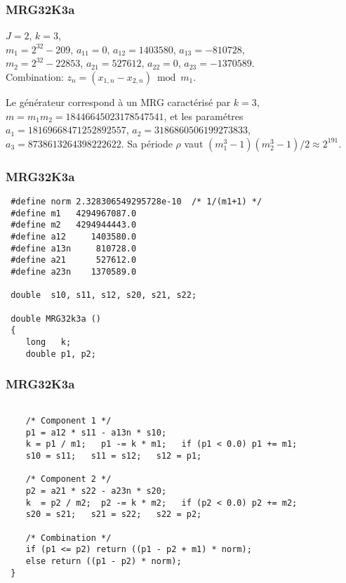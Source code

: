 \documentclass[t,usepdftitle=false]{beamer}
\begin{document}
\begin{frame}
\frametitle{MRG32K3a}

$J=2$, $k=3$, \\
$m_1 = 2^{32} -209$, $a_{11} = 0$, $a_{12} = 1403580$, $a_{13} = -810728$,\\
$m_2 = 2^{32}-22853$, $a_{21} = 527612$, $a_{22} = 0$, $a_{23} = -1370589$.\\
Combination: $z_n = (x_{1,n} - x_{2,n}) \bmod m_1$.

\mbox{}

Le générateur correspond à un MRG caractérisé par $k=3$, $m = m_1 m_2
= 18446645023178547541$, et les paramétres $a_{1} =
18169668471252892557$, $a_{2} = 3186860506199273833$, $a_{3} =
8738613264398222622$. Sa période $\rho$ vaut $(m_1^3-1)(m_2^3-1)/2
\approx 2^{191}$.

\end{frame}

\begin{frame}[fragile]
\frametitle{MRG32K3a}

\begin{footnotesize}
\begin{verbatim}
 #define norm 2.328306549295728e-10  /* 1/(m1+1) */
 #define m1   4294967087.0
 #define m2   4294944443.0
 #define a12     1403580.0
 #define a13n     810728.0
 #define a21      527612.0
 #define a23n    1370589.0

 double  s10, s11, s12, s20, s21, s22;

 double MRG32k3a ()
 {
    long   k;
    double p1, p2;
\end{verbatim}
\end{footnotesize}


\end{frame}

\begin{frame}[fragile]
\frametitle{MRG32K3a}

\begin{footnotesize}
\begin{verbatim}

    /* Component 1 */
    p1 = a12 * s11 - a13n * s10;
    k = p1 / m1;   p1 -= k * m1;   if (p1 < 0.0) p1 += m1;
    s10 = s11;   s11 = s12;   s12 = p1;

    /* Component 2 */
    p2 = a21 * s22 - a23n * s20;
    k  = p2 / m2;  p2 -= k * m2;   if (p2 < 0.0) p2 += m2;
    s20 = s21;   s21 = s22;   s22 = p2;

    /* Combination */
    if (p1 <= p2) return ((p1 - p2 + m1) * norm);
    else return ((p1 - p2) * norm);
 }
\end{verbatim}
\end{footnotesize}

\end{frame}
\end{document}
